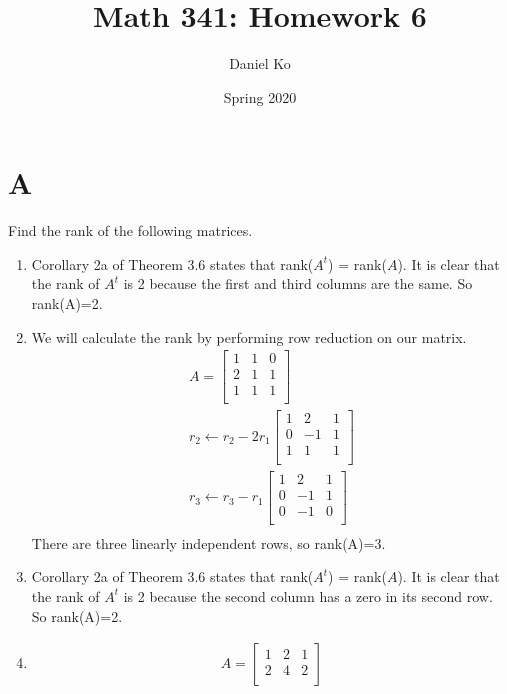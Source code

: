 \documentclass[11pt]{scrartcl}
\title{Math 341: Homework 6}
\author{Daniel Ko}
\date{Spring 2020}
\begin{document}
\maketitle

\section{A}
Find the rank of the following matrices.

\begin{enumerate}[label=\alph*.]
	\item{
			Corollary 2a of Theorem 3.6 states that rank($A^t$) = rank($A$).
			It is clear that the rank of $A^t$ is 2 because the first and third
			columns are the same. So rank(A)=2.
	}
	\item{
		We will calculate the rank by performing row reduction on our matrix.  
		\begin{align*}
		A=
		\begin{bmatrix}
			1 & 1 & 0\\
			2 & 1 & 1\\
			1 & 1 & 1 \\
		\end{bmatrix}\\
		r_2 \leftarrow r_2 - 2r_1
		\begin{bmatrix}
			1 & 2 & 1\\
			0 & -1 & 1\\
			1 & 1 & 1 \\
		\end{bmatrix}\\ 
		r_3 \leftarrow r_3 - r_1
		\begin{bmatrix}
			1 & 2 & 1\\
			0 & -1 & 1\\
			0 & -1 & 0 \\
		\end{bmatrix}\\ 
		\end{align*}
		There are three linearly independent rows, so rank(A)=3.
		}
	\item{
		Corollary 2a of Theorem 3.6 states that rank($A^t$) = rank($A$).
		It is clear that the rank of $A^t$ is 2 because the second column
		has a zero in its second row. So rank(A)=2.
	}
	\item{
		\begin{align*}
			A=
			\begin{bmatrix}
				1 & 2 & 1\\
				2 & 4 & 2\\

\end{bmatrix}
\end{align*}}
\end{enumerate}
\end{document}
